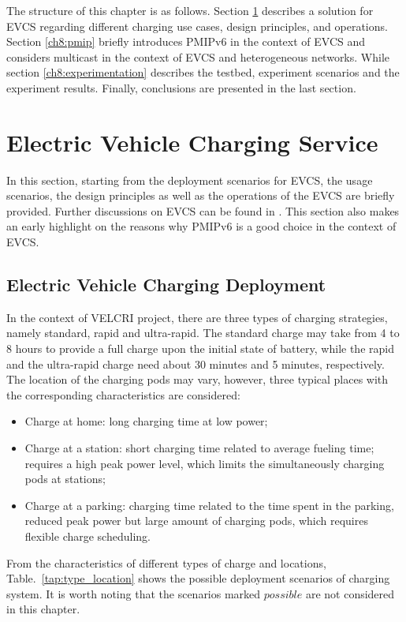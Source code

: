 The structure of this chapter is as follows. Section \ref{ch8:evcs} describes a solution for EVCS regarding different charging use cases, design principles, and operations. Section \ref{ch8:pmip} briefly introduces PMIPv6 in the context of EVCS and considers multicast in the context of EVCS and heterogeneous networks. While section \ref{ch8:experimentation} describes the testbed, experiment scenarios and the experiment results. Finally, conclusions are presented in the last section.

\section{Electric Vehicle Charging Service} \label{ch8:evcs}
In this section, starting from the deployment scenarios for EVCS, the usage scenarios, the design principles as well as the operations of the EVCS are briefly provided. Further discussions on EVCS can be found in \cite{PMIP_EV,velcri_report}. This section also makes an early highlight on the reasons why PMIPv6 is a good choice in the context of EVCS.

\subsection{Electric Vehicle Charging Deployment}
In the context of VELCRI project, there are three types of charging strategies, namely standard, rapid and ultra-rapid. The standard charge may take from 4 to 8 hours to provide a full charge upon the initial state of battery, while the rapid and the ultra-rapid charge need about 30 minutes and 5 minutes, respectively. The location of the charging pods may vary, however, three typical places with the corresponding characteristics are considered:
\begin{itemize}
\itemsep 0.1em
\item Charge at home: long charging time at low power;
\item Charge at a station: short charging time related to average fueling time; requires a high peak power level, which limits the simultaneously charging pods at stations;
\item Charge at a parking: charging time related to the time spent in the parking, reduced peak power but large amount of charging pods, which requires flexible charge scheduling.
\end{itemize} 

From the characteristics of different types of charge and locations, Table.~\ref{tap:type_location} shows the possible deployment scenarios of charging system. It is worth noting that the scenarios marked $\textit{possible}$ are not considered in this chapter.

